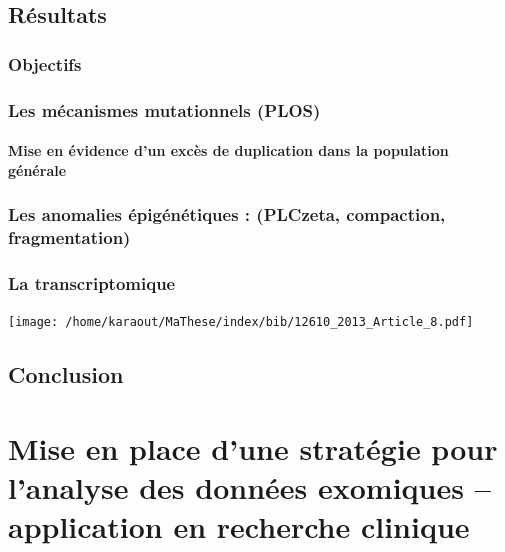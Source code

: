 \documentclass[12pt,twoside]{reedthesis}
\theoremstyle{definition}
\theoremstyle{definition}
\theoremstyle{remark}
\begin{document}
  \section{Résultats}\label{resultats}
  
  \subsection{Objectifs}\label{objectifs}
  
  \subsection{Les mécanismes mutationnels
  (PLOS)}\label{les-mecanismes-mutationnels-plos}
  
  \subsubsection{Mise en évidence d'un excès de duplication dans la
  population
  générale}\label{mise-en-evidence-dun-exces-de-duplication-dans-la-population-generale}
  
  \subsection{Les anomalies épigénétiques : (PLCzeta, compaction,
  fragmentation)}\label{les-anomalies-epigenetiques-plczeta-compaction-fragmentation}
  
  \subsection{La transcriptomique}\label{la-transcriptomique}
  
  \begin{flushleft} 
  \texttt{[image: /home/karaout/MaThese/index/bib/12610\_2013\_Article\_8.pdf]}
  \newpage
  \end{flushleft}
  
  \section{Conclusion}\label{conclusion}
  
  \chapter{Mise en place d'une stratégie pour l'analyse des données
  exomiques -- application en recherche
  clinique}\label{mise-en-place-dune-strategie-pour-lanalyse-des-donnees-exomiques-application-en-recherche-clinique}
  
\end{document}
